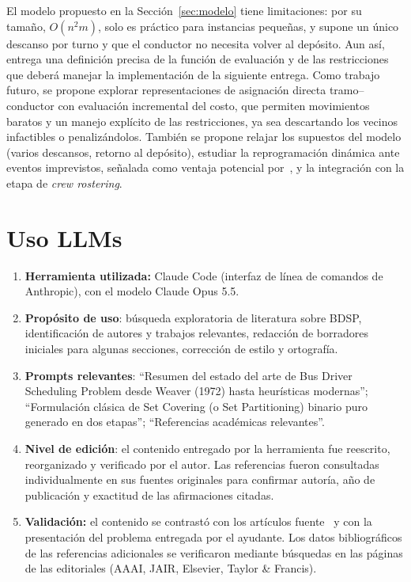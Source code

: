 \documentclass[letter, 10pt]{article}
\begin{document}
El modelo propuesto en la Sección~\ref{sec:modelo} tiene limitaciones: por su tamaño, $O(n^2m)$, solo es práctico para instancias pequeñas, y supone un único descanso por turno y que el conductor no necesita volver al depósito. Aun así, entrega una definición precisa de la función de evaluación y de las restricciones que deberá manejar la implementación de la siguiente entrega. Como trabajo futuro, se propone explorar representaciones de asignación directa tramo--conductor con evaluación incremental del costo, que permiten movimientos baratos y un manejo explícito de las restricciones, ya sea descartando los vecinos infactibles o penalizándolos. También se propone relajar los supuestos del modelo (varios descansos, retorno al depósito), estudiar la reprogramación dinámica ante eventos imprevistos, señalada como ventaja potencial por~\cite{Constantino2017}, y la integración con la etapa de \emph{crew rostering}.

\section{Uso LLMs}
\begin{enumerate}
\item \textbf{Herramienta utilizada:} Claude Code (interfaz de línea de comandos de Anthropic), con el modelo Claude Opus 5.5.
\item \textbf{Prop\'osito de uso}: b\'usqueda exploratoria de literatura sobre BDSP, identificaci\'on de autores y trabajos relevantes, redacci\'on de borradores iniciales para algunas secciones, correcci\'on de estilo y ortograf\'ia.
\item \textbf{Prompts relevantes}: ``Resumen del estado del arte de Bus Driver Scheduling Problem desde Weaver (1972) hasta heur\'isticas modernas''; ``Formulaci\'on cl\'asica de Set Covering (o Set Partitioning) binario puro generado en dos etapas''; ``Referencias acad\'emicas relevantes''.
\item \textbf{Nivel de edici\'on}: el contenido entregado por la herramienta fue reescrito, reorganizado y verificado por el autor. Las referencias fueron consultadas individualmente en sus fuentes originales para confirmar autor\'ia, a\~no de publicaci\'on y exactitud de las afirmaciones citadas.
\item \textbf{Validación:} el contenido se contrastó con los artículos fuente~\cite{DeLeone2011a,Constantino2017} y con la presentación del problema entregada por el ayudante. Los datos bibliográficos de las referencias adicionales se verificaron mediante búsquedas en las páginas de las editoriales (AAAI, JAIR, Elsevier, Taylor \& Francis).
\end{enumerate}



\end{document}

